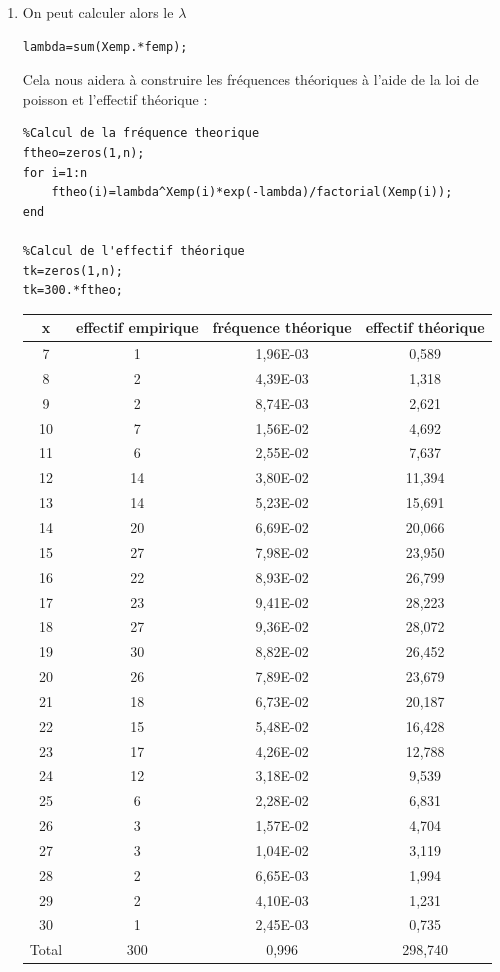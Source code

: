 \documentclass[a4paper,oneside]{article}
\begin{document}
\begin{enumerate}

\item
On peut calculer alors le $\lambda$


\begin{lstlisting}
lambda=sum(Xemp.*femp);
\end{lstlisting}

Cela nous aidera à construire les fréquences théoriques à l'aide de la loi de poisson et l'effectif théorique :

\begin{lstlisting}
%Calcul de la fréquence theorique
ftheo=zeros(1,n);
for i=1:n
    ftheo(i)=lambda^Xemp(i)*exp(-lambda)/factorial(Xemp(i));
end

%Calcul de l'effectif théorique
tk=zeros(1,n);
tk=300.*ftheo;
\end{lstlisting}


\begin{center}
\begin{tabular}{|c|c|c|c|}

 \hline
 x	& effectif empirique & fréquence théorique & effectif théorique\\
 \hline
 7 & 1	& 1,96E-03 & 0,589\\
 8 &	2	& 4,39E-03 & 1,318\\
 9 & 2	& 8,74E-03	&2,621\\
 10	&7	&1,56E-02	&4,692\\
 11	&6&	2,55E-02&	7,637\\
 12	&14	&3,80E-02&	11,394\\
 13	&14&	5,23E-02	&15,691\\
 14	&20	&6,69E-02	&20,066\\
 15	&27&	7,98E-02&23,950\\
 16	&22	&8,93E-02	&26,799\\
 17	&23&	9,41E-02	&28,223\\
 18	&27	&9,36E-02	&28,072\\
 19	&30&	8,82E-02	&26,452\\
 20	&26&	7,89E-02	&23,679\\
 21	&18&	6,73E-02	&20,187\\
 22	&15&	5,48E-02	&16,428\\
 23	&17&	4,26E-02	&12,788\\
 24	&12&	3,18E-02	&9,539\\
 25	&6	&2,28E-02	&6,831\\
 26	&3	&1,57E-02	&4,704\\
 27	&3	&1,04E-02	&3,119\\
 28	&2	&6,65E-03	&1,994\\
 29	&2 &4,10E-03	&1,231\\
 30	&1	&2,45E-03	&0,735\\
 \hline
 Total	&300	&0,996	&298,740\\


\end{tabular}
\end{center}
\end{enumerate}
\end{document}
